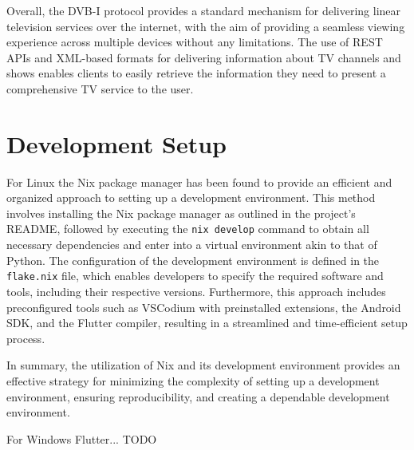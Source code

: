 \documentclass[conference]{IEEEtran}
\begin{document}
Overall, the DVB-I protocol provides a standard mechanism for delivering linear television services over the internet, with the aim of providing a seamless viewing experience across multiple devices without any limitations. The use of REST APIs and XML-based formats for delivering information about TV channels and shows enables clients to easily retrieve the information they need to present a comprehensive TV service to the user.


\section{Development Setup}

For Linux the Nix package manager has been found to provide an efficient and organized approach to setting up a development environment. This method involves installing the Nix package manager as outlined in the project's README, followed by executing the \texttt{nix develop} command to obtain all necessary dependencies and enter into a virtual environment akin to that of Python. The configuration of the development environment is defined in the \texttt{flake.nix} file, which enables developers to specify the required software and tools, including their respective versions. Furthermore, this approach includes preconfigured tools such as VSCodium with preinstalled extensions, the Android SDK, and the Flutter compiler, resulting in a streamlined and time-efficient setup process.

In summary, the utilization of Nix and its development environment provides an effective strategy for minimizing the complexity of setting up a development environment, ensuring reproducibility, and creating a dependable development environment.

For Windows Flutter... TODO
\end{document}
